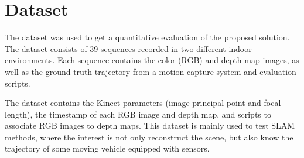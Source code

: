 \section{Dataset}

The dataset \cite{sturm12iros} was used to get a quantitative evaluation 
of the proposed solution. The dataset consists of 39 sequences recorded in
two different indoor environments. Each sequence contains
the color (RGB) and depth map images, as well as the ground truth
trajectory from a motion capture system and  evaluation 
scripts.

The dataset contains the Kinect parameters (image principal point and focal length), the timestamp of each RGB image and depth map, 
and scripts to associate RGB images to depth maps. This dataset is mainly used to test SLAM methods, where the 
interest is not only reconstruct the scene, but also know the trajectory of some moving vehicle equipped with
 sensors.

